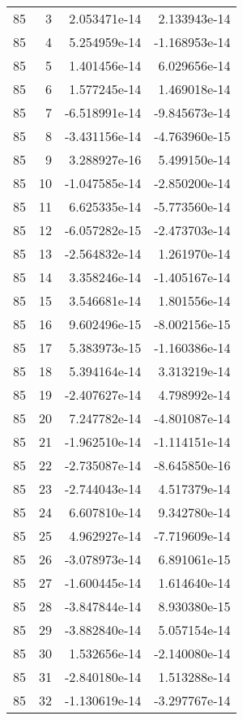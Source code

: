 \begin{tabular}{rrrr}
  85 &    3 &  2.053471e-14 &  2.133943e-14 \\
  85 &    4 &  5.254959e-14 & -1.168953e-14 \\
  85 &    5 &  1.401456e-14 &  6.029656e-14 \\
  85 &    6 &  1.577245e-14 &  1.469018e-14 \\
  85 &    7 & -6.518991e-14 & -9.845673e-14 \\
  85 &    8 & -3.431156e-14 & -4.763960e-15 \\
  85 &    9 &  3.288927e-16 &  5.499150e-14 \\
  85 &   10 & -1.047585e-14 & -2.850200e-14 \\
  85 &   11 &  6.625335e-14 & -5.773560e-14 \\
  85 &   12 & -6.057282e-15 & -2.473703e-14 \\
  85 &   13 & -2.564832e-14 &  1.261970e-14 \\
  85 &   14 &  3.358246e-14 & -1.405167e-14 \\
  85 &   15 &  3.546681e-14 &  1.801556e-14 \\
  85 &   16 &  9.602496e-15 & -8.002156e-15 \\
  85 &   17 &  5.383973e-15 & -1.160386e-14 \\
  85 &   18 &  5.394164e-14 &  3.313219e-14 \\
  85 &   19 & -2.407627e-14 &  4.798992e-14 \\
  85 &   20 &  7.247782e-14 & -4.801087e-14 \\
  85 &   21 & -1.962510e-14 & -1.114151e-14 \\
  85 &   22 & -2.735087e-14 & -8.645850e-16 \\
  85 &   23 & -2.744043e-14 &  4.517379e-14 \\
  85 &   24 &  6.607810e-14 &  9.342780e-14 \\
  85 &   25 &  4.962927e-14 & -7.719609e-14 \\
  85 &   26 & -3.078973e-14 &  6.891061e-15 \\
  85 &   27 & -1.600445e-14 &  1.614640e-14 \\
  85 &   28 & -3.847844e-14 &  8.930380e-15 \\
  85 &   29 & -3.882840e-14 &  5.057154e-14 \\
  85 &   30 &  1.532656e-14 & -2.140080e-14 \\
  85 &   31 & -2.840180e-14 &  1.513288e-14 \\
  85 &   32 & -1.130619e-14 & -3.297767e-14 \\

\end{tabular}

